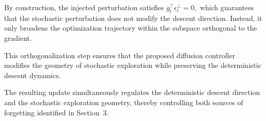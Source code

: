 \documentclass{article}
\begin{document}
By construction, the injected perturbation satisfies $g_t^\top \epsilon_t^\perp = 0 ,$
which guarantees that the stochastic perturbation does not modify the descent direction.
Instead, it only broadens the optimization trajectory within the subspace orthogonal to the gradient.




This orthogonalization step ensures that the proposed diffusion controller modifies the geometry of stochastic exploration while preserving the deterministic descent dynamics.

The resulting update simultaneously regulates the deterministic descent direction and the stochastic exploration geometry, thereby controlling both sources of forgetting identified in Section~3.





\end{document}
